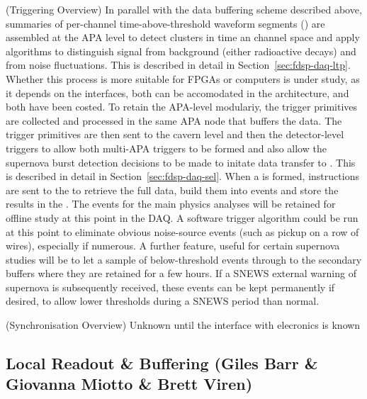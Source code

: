 (Triggering Overview) In parallel with the data buffering scheme
described above, summaries of per-channel time-above-threshold
waveform segments () are assembled at the APA
level to detect clusters in time an channel space and apply algorithms
to distinguish signal from background (either radioactive decays) and
from noise fluctuations. This is described in detail in
Section~\ref{sec:fdsp-daq-ltp}.
Whether this process is more suitable for FPGAs or computers is under
study, as it depends on the interfaces, both can be accomodated in the
architecture, and both have been costed. 
To retain the APA-level modulariy, the trigger primitives are
collected and processed in the same APA node that buffers the data.
The trigger primitives are then sent to the cavern level and then the
detector-level triggers to allow both multi-APA triggers to be formed
and also allow the supernova burst detection decisions to be made to
initate data transfer to . 
This is described in detail in Section~\ref{sec:fdsp-daq-sel}.
When a  is formed, instructions are sent to the
 to retrieve the full data, build them into events
and store the results in the .
The events for the main physics analyses will be retained for offline
study at this point in the DAQ. 
A software trigger algorithm could be run at this point to eliminate
obvious noise-source events (such as pickup on a row of wires),
especially if numerous. 
A further feature, useful for certain supernova studies will be to let
a sample of below-threshold events through to the secondary buffers
where they are retained for a few hours. 
If a SNEWS external warning of supernova is subsequently received,
these events can be kept permanently if desired, to allow lower
thresholds during a SNEWS period than normal.

(Synchronisation Overview) Unknown until the interface with elecronics is known

\subsection{Local Readout \& Buffering (Giles Barr \& Giovanna Miotto \& Brett Viren)}
\label{sec:fdsp-daq-ltr}

